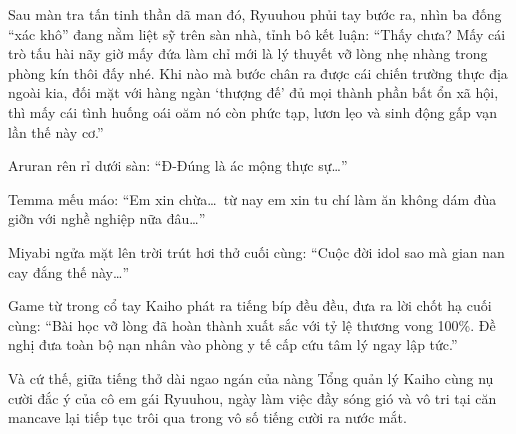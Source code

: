 \documentclass[../main.tex]{subfiles}
\begin{document}
Sau màn tra tấn tinh thần dã man đó, Ryuuhou phủi tay bước ra, nhìn ba đống ``xác khô'' đang nằm liệt sỹ trên sàn nhà, tỉnh bô kết luận: ``Thấy chưa? Mấy cái trò tấu hài nãy giờ mấy đứa làm chỉ mới là lý thuyết vỡ lòng nhẹ nhàng trong phòng kín thôi đấy nhé. Khi nào mà bước chân ra được cái chiến trường thực địa ngoài kia, đối mặt với hàng ngàn `thượng đế' đủ mọi thành phần bất ổn xã hội, thì mấy cái tình huống oái oăm nó còn phức tạp, lươn lẹo và sinh động gấp vạn lần thế này cơ.''

Aruran rên rỉ dưới sàn: ``Đ-Đúng là ác mộng thực sự\dots''

Temma mếu máo: ``Em xin chừa\dots\ từ nay em xin tu chí làm ăn không dám đùa giỡn với nghề nghiệp nữa đâu\dots''

Miyabi ngửa mặt lên trời trút hơi thở cuối cùng: ``Cuộc đời idol sao mà gian nan cay đắng thế này\dots''

Game từ trong cổ tay Kaiho phát ra tiếng bíp đều đều, đưa ra lời chốt hạ cuối cùng: ``Bài học vỡ lòng đã hoàn thành xuất sắc với tỷ lệ thương vong 100\%. Đề nghị đưa toàn bộ nạn nhân vào phòng y tế cấp cứu tâm lý ngay lập tức.''

Và cứ thế, giữa tiếng thở dài ngao ngán của nàng Tổng quản lý Kaiho cùng nụ cười đắc ý của cô em gái Ryuuhou, ngày làm việc đầy sóng gió và vô tri tại căn mancave lại tiếp tục trôi qua trong vô số tiếng cười ra nước mắt.
\end{document}
